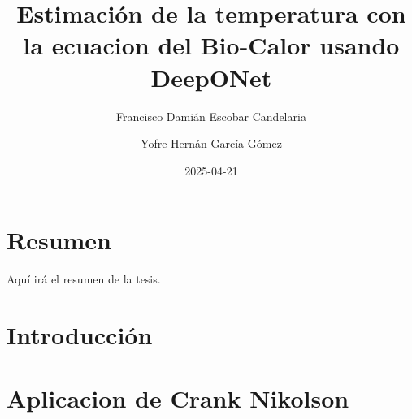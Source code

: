 \documentclass[
  spanish,
  us-letterpaper,
  DIV=11,
  numbers=noendperiod]{scrreprt}
\title{Estimación de la temperatura con la ecuacion del Bio-Calor usando
DeepONet}
\author{Francisco Damián Escobar Candelaria \and Yofre Hernán García
Gómez}
\date{2025-04-21}
\renewcommand*\contentsname{Tabla de contenidos}
\newcommand\contentsname{Tabla de contenidos}
\theoremstyle{definition}
\theoremstyle{plain}
\theoremstyle{remark}
\begin{document}
\maketitle

\renewcommand*\contentsname{Tabla de contenidos}
{
\hypersetup{linkcolor=}
\setcounter{tocdepth}{2}
\tableofcontents
}


\chapter*{Resumen}\label{resumen}


Aquí irá el resumen de la tesis.


\chapter{Introducción}\label{introducciuxf3n}


\chapter{Aplicacion de Crank
Nikolson}\label{aplicacion-de-crank-nikolson}
\end{document}
